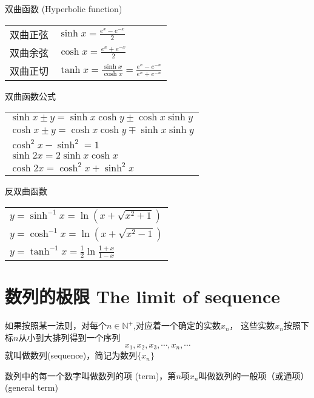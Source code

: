 \documentclass[UTF8]{ctexart}
\begin{document}
双曲函数 (Hyperbolic function)

\begin{center}
  \begin{tabular}{cl}
    双曲正弦 & $\sinh{x}=\frac{e^x-e^{-x}}{2}$\\
    双曲余弦 & $\cosh{x}=\frac{e^x+e^{-x}}{2}$\\
    双曲正切 & $\tanh{x}=\frac{\sinh{x}}{\cosh{x}}=\frac{e^x-e^{-x}}{e^x+e^{-x}}$
  \end{tabular}
\end{center}

\bigskip

双曲函数公式

\begin{center}
  \begin{tabular}{l}
    $\sinh{x\pm y}=\sinh{x}\cosh{y}\pm\cosh{x}\sinh{y}$\\
    $\cosh{x\pm y}=\cosh{x}\cosh{y}\mp\sinh{x}\sinh{y}$\\
    $\cosh^2{x} - \sinh^2 = 1$\\
    $\sinh{2x}=2\sinh{x}\cosh{x}$\\
    $\cosh{2x}=\cosh^2{x}+\sinh^2{x}$
  \end{tabular}
\end{center}

\bigskip

反双曲函数

\begin{center}
  \begin{tabular}{l}
    $y=\sinh^{-1}{x}=\ln(x+\sqrt{x^2+1})$\\
    $y=\cosh^{-1}{x}=\ln(x+\sqrt{x^2-1})$\\
    $y=\tanh^{-1}{x}=\frac{1}{2}\ln\frac{1+x}{1-x}$
  \end{tabular}
\end{center}


\bigskip
\bigskip
\section*{数列的极限 The limit of sequence}

\bigskip

如果按照某一法则，对每个$n\in\mathbb{N}^+$,对应着一个确定的实数$x_n$，
这些实数$x_n$按照下标$n$从小到大排列得到一个序列
\[
x_1,x_2,x_3,\cdots,x_n,\cdots
\]
就叫做数列(sequence)，简记为数列$\{x_n\}$

数列中的每一个数字叫做数列的项 (term)，第$n$项$x_n$叫做数列的一般项（或通项） (general term)
\end{document}
